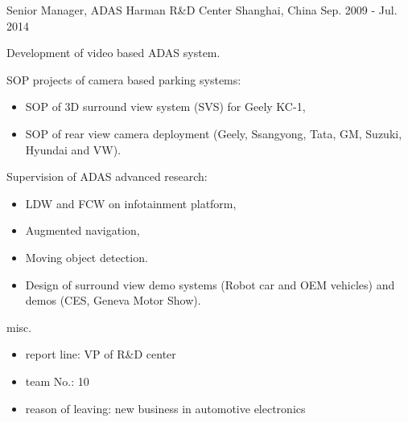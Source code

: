 \documentclass[../cv.tex]{subfiles}
\begin{document}
\begin{cventries}
	\cventry
	{Senior Manager, ADAS} %
	{Harman R\&D Center} %
	{Shanghai, China} %
	{Sep. 2009 - Jul. 2014} %
	{
		\begin{cvitems}
			\item Development of video based ADAS system.
			\item SOP projects of camera based parking systems:
			\begin{itemize}
				\item SOP of 3D surround view system (SVS) for Geely KC-1,
				\item SOP of rear view camera deployment (Geely, Ssangyong, Tata, GM, Suzuki, Hyundai and VW).
			\end{itemize}
			\item Supervision of ADAS advanced research:
			\begin{itemize}
				\item LDW and FCW on infotainment platform,
				\item Augmented navigation,
				\item Moving object detection.
				\item Design of surround view demo systems (Robot car and OEM vehicles) and demos (CES, Geneva Motor Show).
			\end{itemize}
			\item misc.
			\begin{itemize}
				\item report line: VP of R\&D center
				\item team No.: 10
				\item reason of leaving: new business in automotive electronics
			\end{itemize}
		\end{cvitems}
	}
\end{cventries}
\end{document}
